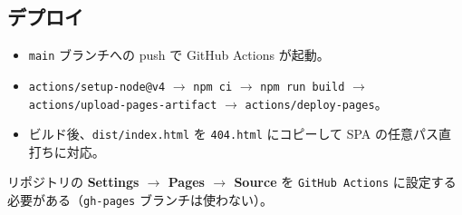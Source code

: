 \subsection{デプロイ}

\begin{itemize}[leftmargin=*,itemsep=2pt]
  \item \texttt{main} ブランチへの push で GitHub Actions が起動。
  \item \texttt{actions/setup-node@v4} $\rightarrow$ \texttt{npm ci}
        $\rightarrow$ \texttt{npm run build} $\rightarrow$
        \texttt{actions/upload-pages-artifact}
        $\rightarrow$ \texttt{actions/deploy-pages}。
  \item ビルド後、\texttt{dist/index.html} を \texttt{404.html} にコピーして
        SPA の任意パス直打ちに対応。
\end{itemize}

\begin{cautionbox}[初回のみ必要な設定]
リポジトリの \textbf{Settings $\to$ Pages $\to$ Source} を
\texttt{GitHub Actions} に設定する必要がある（\texttt{gh-pages} ブランチは使わない）。
\end{cautionbox}

